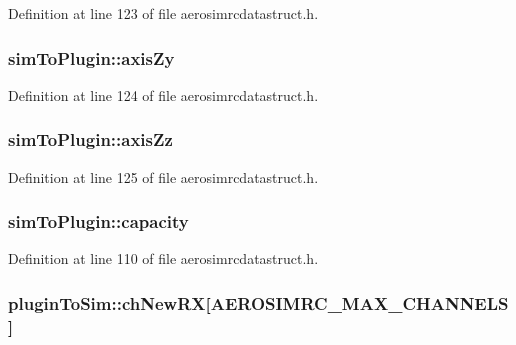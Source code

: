 Definition at line 123 of file aerosimrcdatastruct.\-h.

\hypertarget{group___aero_sim_r_c_ga28db280f796bbada439e147a61037c0f}{
\subsubsection[{axis\-Zy}]{ sim\-To\-Plugin\-::axis\-Zy}}\label{group___aero_sim_r_c_ga28db280f796bbada439e147a61037c0f}


Definition at line 124 of file aerosimrcdatastruct.\-h.

\hypertarget{group___aero_sim_r_c_ga62dda20d79d63155064a31a27d06e930}{
\subsubsection[{axis\-Zz}]{ sim\-To\-Plugin\-::axis\-Zz}}\label{group___aero_sim_r_c_ga62dda20d79d63155064a31a27d06e930}


Definition at line 125 of file aerosimrcdatastruct.\-h.

\hypertarget{group___aero_sim_r_c_ga735a5ea26beaee930a4bd7e2d8e18398}{
\subsubsection[{capacity}]{ sim\-To\-Plugin\-::capacity}}\label{group___aero_sim_r_c_ga735a5ea26beaee930a4bd7e2d8e18398}


Definition at line 110 of file aerosimrcdatastruct.\-h.

\hypertarget{group___aero_sim_r_c_gaa465d9eaa30d7a906bd3672768e5b380}{
\subsubsection[{ch\-New\-R\-X}]{ plugin\-To\-Sim\-::ch\-New\-R\-X\mbox{[}{\bf A\-E\-R\-O\-S\-I\-M\-R\-C\-\_\-\-M\-A\-X\-\_\-\-C\-H\-A\-N\-N\-E\-L\-S}\mbox{]}}}\label{group___aero_sim_r_c_gaa465d9eaa30d7a906bd3672768e5b380}


